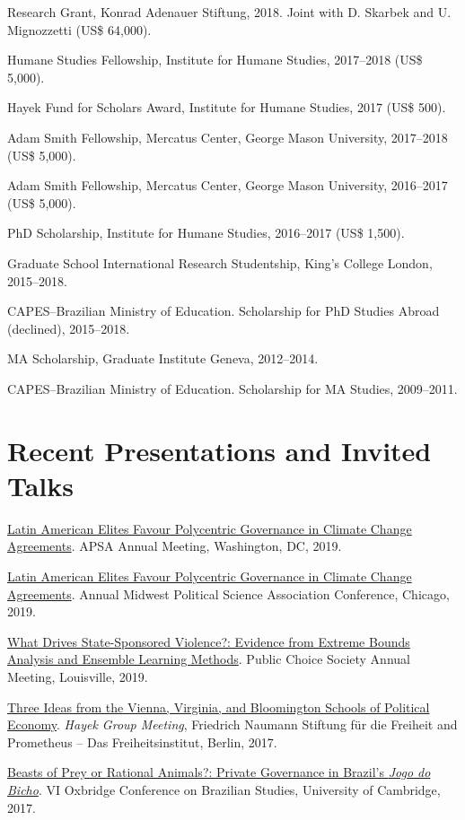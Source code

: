 \documentclass[a4paper]{article}
\renewenvironment{itemize}{
  \begin{list}{}{
    \setlength{\leftmargin}{1.5em}
  }
}{
  \end{list}
}
\begin{document}
\begin{itemize}
    \item Research Grant, Konrad Adenauer Stiftung, 2018. Joint with D. Skarbek and U. Mignozzetti (US\$ 64,000).
	\item Humane Studies Fellowship, Institute for Humane Studies, 2017--2018 (US\$ 5,000).
	\item Hayek Fund for Scholars Award, Institute for Humane Studies, 2017 (US\$ 500).
	\item Adam Smith Fellowship, Mercatus Center, George Mason University, 2017--2018 (US\$ 5,000).
	\item Adam Smith Fellowship, Mercatus Center, George Mason University, 2016--2017 (US\$ 5,000).
	\item PhD Scholarship, Institute for Humane Studies, 2016--2017 (US\$ 1,500).
	\item Graduate School International Research Studentship, King's College London, 2015--2018.
	\item CAPES--Brazilian Ministry of Education. Scholarship for PhD Studies Abroad (declined), 2015--2018.
	\item MA Scholarship, Graduate Institute Geneva, 2012--2014.
	\item CAPES--Brazilian Ministry of Education. Scholarship for MA Studies, 2009--2011.
\end{itemize}

\section*{Recent Presentations and Invited Talks}

\begin{itemize}
    \item \href{https://osf.io/9a6ch}{Latin American Elites Favour Polycentric Governance in Climate Change Agreements}. APSA Annual Meeting, Washington, DC, 2019.
    \item \href{https://osf.io/9a6ch}{Latin American Elites Favour Polycentric Governance in Climate Change Agreements}. Annual Midwest Political Science Association Conference, Chicago, 2019.
    \item \href{http://danilofreire.github.io/pcs-2019}{What Drives State-Sponsored Violence?: Evidence from Extreme Bounds Analysis and Ensemble Learning Methods}. Public Choice Society Annual Meeting, Louisville, 2019.
    \item \href{https://www.overleaf.com/project/591ef5259fb58ede3dc4d369}{Three Ideas from the Vienna, Virginia, and Bloomington Schools of Political Economy}. \textit{Hayek Group Meeting}, Friedrich Naumann Stiftung f{\"u}r die Freiheit and Prometheus -- Das Freiheitsinstitut, Berlin, 2017.
	\item \href{https://osf.io/se2jr}{Beasts of Prey or Rational Animals?: Private Governance in Brazil's \emph{Jogo do Bicho}}. VI Oxbridge Conference on Brazilian Studies, University of Cambridge, 2017.
\end{itemize}
\end{document}
